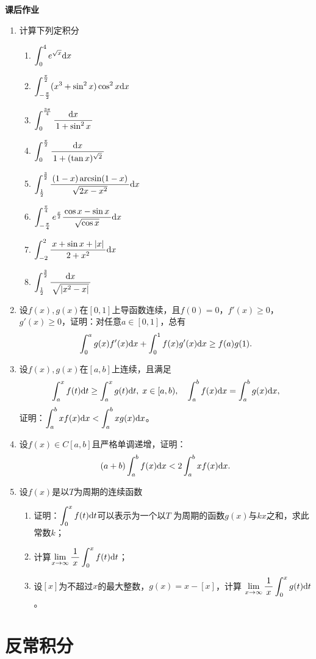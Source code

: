 \begin{ext}
	{\bf 课后作业}
	
	\begin{enumerate}
	  \item 计算下列定积分
	  \begin{enumerate}[(1)]
	    \item $\displaystyle\int_0^4e^{\sqrt x}\mathrm{d} x$
	    \item $\displaystyle\int_{-\frac{\pi}2}^{\frac{\pi}2}(x^3+\sin^2x)\cos^2x\mathrm{d} x$
	    \item $\displaystyle\int_0^{\frac{3\pi}4}\displaystyle\frac{\,{\mathrm{d} x}\,}{\,{1+\sin^2x}\,}$
	    \item $\displaystyle\int_0^{\frac{\pi}2}\displaystyle\frac{\,{\mathrm{d} x}\,}{\,{1+(\tan x)^{\sqrt 2}}\,}$
	    \item $\displaystyle\int_{\frac12}^{\frac32}\displaystyle\frac{\,{(1-x)\arcsin(1-x)}\,}{\,{\sqrt{2x-x^2}}\,}\mathrm{d} x$
	    \item $\displaystyle\int_{-\frac{\pi}4}^{\frac{\pi}4}e^{\frac x2}
	    \displaystyle\frac{\,{\cos x-\sin x}\,}{\,{\sqrt{\cos x}}\,}\mathrm{d} x$
	    \item $\displaystyle\int_{-2}^2\displaystyle\frac{\,{x+\sin x+|x|}\,}{\,{2+x^2}\,}\mathrm{d} x$
	    \item $\displaystyle\int_{\frac12}^{\frac32}\displaystyle\frac{\,{\mathrm{d} x}\,}{\,{\sqrt{|x^2-x|}}\,}$
	  \end{enumerate}
	  \item 设$f(x),g(x)$在$[0,1]$上导函数连续，且$f(0)=0$，$f'(x)\geq0$，
	  $g'(x)\geq0$，证明：对任意$a\in[0,1]$，总有
	  $$\displaystyle\int_0^ag(x)f'(x)\mathrm{d} x+\displaystyle\int_0^1f(x)g'(x)\mathrm{d} x\geq f(a)g(1).$$
	  \item 设$f(x),g(x)$在$[a,b]$上连续，且满足
	  $$\displaystyle\int_a^xf(t)\mathrm{d} t\geq \displaystyle\int_a^xg(t)\mathrm{d} t,\;x\in[a,b),
	  \quad \displaystyle\int_a^bf(x)\mathrm{d} x=\displaystyle\int_a^bg(x)\mathrm{d} x,$$
	  证明：$\displaystyle\int_a^bxf(x)\mathrm{d} x<\displaystyle\int_a^bxg(x)\mathrm{d} x$。
	  \item 设$f(x)\in C[a,b]$且严格单调递增，证明：
	  $$(a+b)\displaystyle\int_a^bf(x)\mathrm{d} x<2\displaystyle\int_a^bxf(x)\mathrm{d} x.$$
	  \item 设$f(x)$是以$T$为周期的连续函数
	  \begin{enumerate}[(1)]
	    \item 证明：$\displaystyle\int_0^xf(t)\mathrm{d} t$可以表示为一个以$T$
	    为周期的函数$g(x)$与$kx$之和，求此常数$k$；
	    \item 计算$\lim\limits_{x\to{\infty}}\displaystyle\frac{\,{1}\,}{\,{x}\,}\displaystyle\int_0^xf(t)\mathrm{d} t$；
	    \item 设$[x]$为不超过$x$的最大整数，$g(x)=x-[x]$，计算
	    $\lim\limits_{x\to{\infty}}\displaystyle\frac{\,{1}\,}{\,{x}\,}\displaystyle\int_0^xg(t)\mathrm{d} t$。
	  \end{enumerate}
	\end{enumerate}
\end{ext}

\section{反常积分}

